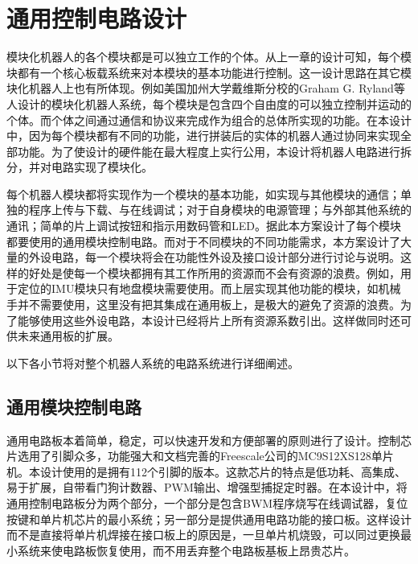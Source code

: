 

\chapter{通用控制电路设计}
\label{chap:electricalSystem}
模块化机器人的各个模块都是可以独立工作的个体。从上一章的设计可知，每个模块都有一个核心板载系统来对本模块的基本功能进行控制。这一设计思路在其它模块化机器人上也有所体现。例如美国加州大学戴维斯分校的Graham G. Ryland等人设计的模块化机器人系统，每个模块是包含四个自由度的可以独立控制并运动的个体。而个体之间通过通信和协议来完成作为组合的总体所实现的功能。在本设计中，因为每个模块都有不同的功能，进行拼装后的实体的机器人通过协同来实现全部功能。为了使设计的硬件能在最大程度上实行公用，本设计将机器人电路进行拆分，并对电路实现了模块化。

每个机器人模块都将实现作为一个模块的基本功能，如实现与其他模块的通信；单独的程序上传与下载、与在线调试；对于自身模块的电源管理；与外部其他系统的通讯；简单的片上调试按钮和指示用数码管和LED。据此本方案设计了每个模块都要使用的通用模块控制电路。而对于不同模块的不同功能需求，本方案设计了大量的外设电路，每一个模块将会在功能性外设及接口设计部分进行讨论与说明。这样的好处是使每一个模块都拥有其工作所用的资源而不会有资源的浪费。例如，用于定位的IMU模块只有地盘模块需要使用。而上层实现其他功能的模块，如机械手并不需要使用，这里没有把其集成在通用板上，是极大的避免了资源的浪费。为了能够使用这些外设电路，本设计已经将片上所有资源系数引出。这样做同时还可供未来通用板的扩展。

以下各小节将对整个机器人系统的电路系统进行详细阐述。

\section{通用模块控制电路}
通用电路板本着简单，稳定，可以快速开发和方便部署的原则进行了设计。控制芯片选用了引脚众多，功能强大和文档完善的Freescale公司的MC9S12XS128单片机。本设计使用的是拥有112个引脚的版本。这款芯片的特点是低功耗、高集成、易于扩展，自带看门狗计数器、PWM输出、增强型捕捉定时器。在本设计中，将通用控制电路板分为两个部分，一个部分是包含BWM程序烧写在线调试器，复位按键和单片机芯片的最小系统；另一部分是提供通用电路功能的接口板。这样设计而不是直接将单片机焊接在接口板上的原因是，一旦单片机烧毁，可以同过更换最小系统来使电路板恢复使用，而不用丢弃整个电路板基板上昂贵芯片。

